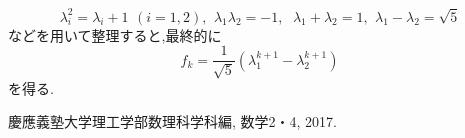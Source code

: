 \documentclass[a4paper,12pt]{jarticle}
\begin{document}
\[ \lambda_i^2 = \lambda_i + 1\,\ (i = 1,2), \,\ \lambda_1\lambda_2 = -1, \,\ \ \lambda_1 + \lambda_2 = 1, 
\,\ \lambda_1 - \lambda_2 = \sqrt{5} \]
などを用いて整理すると,最終的に
\[ f_k = \frac{1}{\sqrt{5}} ( \lambda_1^{k+1} - \lambda_2^{k+1} ) \]
を得る.




\begin{thebibliography}{9}
 慶應義塾大学理工学部数理科学科編, 数学2・4, 2017.
\end{thebibliography}
\end{document}
